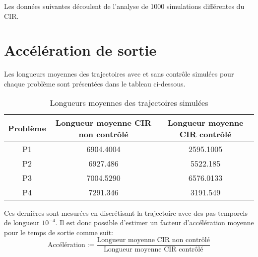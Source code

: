 \label{control_simulations}

Les données suivantes découlent de l'analyse de 1000 simulations différentes du \acs{CIR}. 

\section*{Accélération de sortie}
Les longueurs moyennes des trajectoires avec et sans contrôle simulées pour chaque problème sont présentées dans le tableau ci-dessous.
\begin{table}[htb]
        \centering
        \caption{Longueurs moyennes des trajectoires simulées}\label{tab:simulation_lengths}
        \renewcommand{\arraystretch}{1.4}
        \begin{tabular}{||c|c|c||}
        \hline
        Problème &
        Longueur moyenne CIR non contrôlé &
        Longueur moyenne CIR contrôlé \\
        \hline\hline
        P1 & 6904.4004 & 2595.1005 \\
        P2 & 6927.486 & 5522.185 \\
        P3 & 7004.5290 & 6576.0133 \\
        P4 & 7291.346 & 3191.549 \\
        \hline
        \end{tabular}
\end{table}\FloatBarrier Ces dernières sont mesurées en discrétisant la trajectoire avec des pas temporels de longueur $10^{-4}$. Il est donc possible d'estimer un facteur d'accélération moyenne pour le temps de sortie comme suit: 
\[
\text{Accélération}:=\frac{\text{Longueur moyenne CIR non contrôlé}}{\text{Longueur moyenne CIR contrôlé}}
\]
\pagebreak
